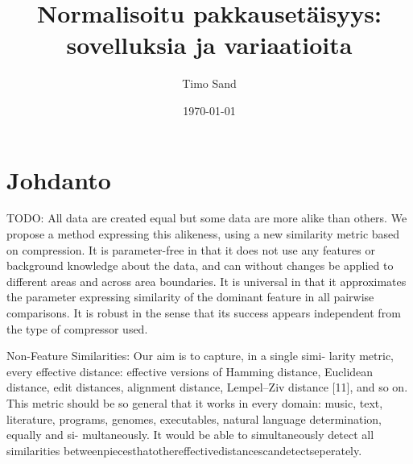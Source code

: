 \documentclass[12pt,finnish,draft]{tktltiki2}
\title{Normalisoitu pakkausetäisyys: sovelluksia ja variaatioita}
\author{Timo Sand}
\date{\today}
\theoremstyle{definition}
\theoremstyle{remark}
\begin{document}

\frontmatter      %

\maketitle        %
\makeabstract     %

\tableofcontents  %


\mainmatter       %

\section{Johdanto} %
\label{sec:johdanto}
\iffalse
  TODO: All data are created equal but some data are more alike than others. We propose a method expressing this alikeness, using a new similarity metric based on compression. It is parameter-free in that it does not use any features or background knowledge about the data, and can without changes be applied to different areas and across area boundaries. It is universal in that it approximates the parameter expressing similarity of the dominant feature in all pairwise comparisons. It is robust in the sense that its success appears independent from the type of compressor used.

  Non-Feature Similarities: Our aim is to capture, in a single simi- larity metric, every effective distance: effective versions of Hamming distance, Euclidean distance, edit distances, alignment distance, Lempel–Ziv distance [11], and so on. This metric should be so general that it works in every domain: music, text, literature, programs, genomes, executables, natural language determination, equally and si- multaneously. It would be able to simultaneously detect all similarities betweenpiecesthatothereffectivedistancescandetectseperately.
\end{document}
